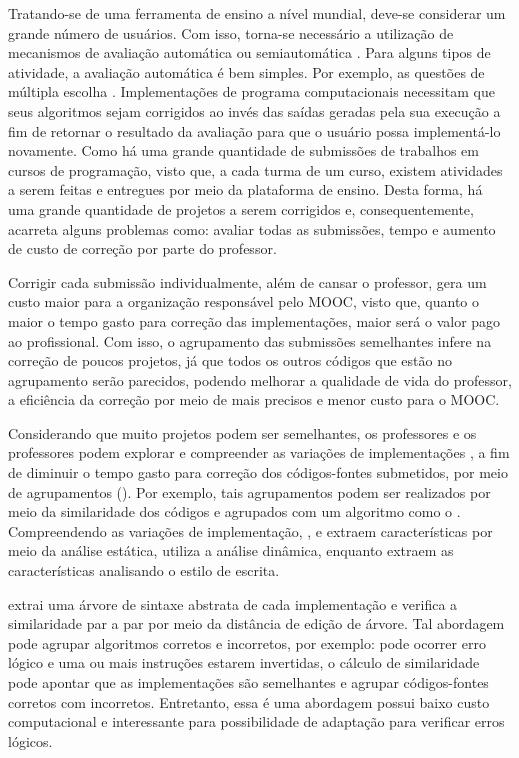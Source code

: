 	Tratando-se de uma ferramenta de ensino a nível mundial, deve-se considerar um
	grande número de usuários. Com isso, torna-se necessário a utilização de mecanismos
	de avaliação automática ou semiautomática \cite{schmidt2013producing}. Para alguns
	tipos de atividade, a avaliação automática é bem simples. Por exemplo, as questões
	de múltipla escolha \cite{alario2013analysing}. Implementações de programa computacionais
	necessitam que seus algoritmos sejam corrigidos ao invés das saídas geradas pela sua
	execução a fim de retornar o resultado da avaliação para que o usuário possa
	implementá-lo novamente. Como há uma grande quantidade de submissões de trabalhos em
	cursos de programação, visto que, a cada turma de um curso, existem atividades a
	serem feitas e entregues por meio da plataforma de ensino. Desta forma, há uma grande
	quantidade de projetos a serem corrigidos e, consequentemente, acarreta alguns
	problemas como: avaliar todas as submissões, tempo e aumento de custo de correção por
	parte do professor.
	
	
	Corrigir cada submissão individualmente, além de cansar o professor, gera um custo maior
	para a organização responsável pelo MOOC, visto que, quanto o maior o tempo gasto
	para correção das implementações, maior será o valor pago ao profissional. Com
	isso, o agrupamento das submissões semelhantes infere na correção de poucos
	projetos, já que todos os outros códigos que estão no agrupamento serão
	parecidos, podendo melhorar a qualidade de vida do professor, a eficiência da correção
	por meio de  mais precisos e menor custo para o MOOC.
	
	Considerando que muito projetos podem ser semelhantes, os professores e os professores podem
	explorar e compreender as variações de implementações \cite{Yin:2015}, a fim de
	diminuir o tempo gasto para correção dos códigos-fontes submetidos, por meio de
	agrupamentos (). Por exemplo, tais agrupamentos podem ser
	realizados por meio da similaridade dos códigos e agrupados com um algoritmo como
	o . Compreendendo as variações de implementação, ,
	 e  extraem características
	por meio da análise estática,  utiliza a análise dinâmica,
	enquanto  extraem as características analisando o estilo de escrita.
	
	 extrai uma árvore de sintaxe abstrata de cada implementação
	e verifica a similaridade par a par por meio da distância de edição de árvore. Tal
	abordagem pode agrupar algoritmos corretos e incorretos, por exemplo: pode ocorrer
	erro lógico e uma ou mais instruções estarem invertidas, o cálculo de similaridade
	pode apontar que as implementações são semelhantes e agrupar códigos-fontes corretos
	com incorretos. Entretanto, essa é uma abordagem possui baixo custo computacional e
	interessante para possibilidade de adaptação para verificar erros lógicos.
	
